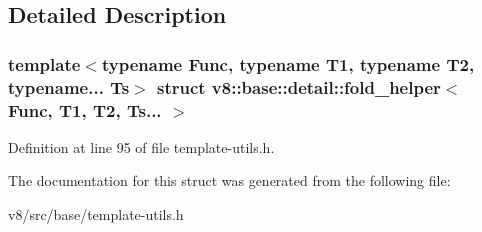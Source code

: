 \subsection{Detailed Description}
\subsubsection*{template$<$typename Func, typename T1, typename T2, typename... Ts$>$\newline
struct v8\+::base\+::detail\+::fold\+\_\+helper$<$ Func, T1, T2, Ts... $>$}



Definition at line 95 of file template-\/utils.\+h.



The documentation for this struct was generated from the following file\+:\begin{DoxyCompactItemize}
\item 
v8/src/base/template-\/utils.\+h\end{DoxyCompactItemize}
